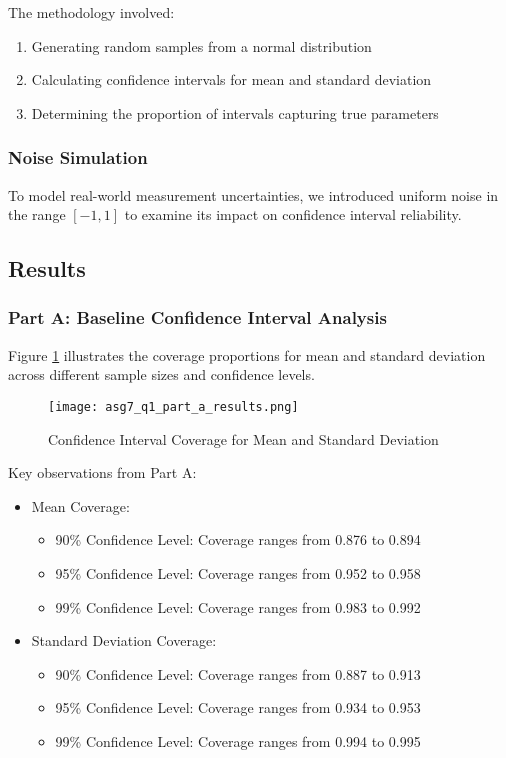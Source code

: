 \documentclass[12pt]{article}
\begin{document}
The methodology involved:
\begin{enumerate}
    \item Generating random samples from a normal distribution
    \item Calculating confidence intervals for mean and standard deviation
    \item Determining the proportion of intervals capturing true parameters
\end{enumerate}

\subsubsection{Noise Simulation}
To model real-world measurement uncertainties, we introduced uniform noise in the range $[-1, 1]$ to examine its impact on confidence interval reliability.

\subsection{Results}

\subsubsection{Part A: Baseline Confidence Interval Analysis}
Figure \ref{fig:asg7_q1_part_a_results} illustrates the coverage proportions for mean and standard deviation across different sample sizes and confidence levels.

\begin{figure}[H]
    \centering
    \texttt{[image: asg7\_q1\_part\_a\_results.png]}
    \caption{Confidence Interval Coverage for Mean and Standard Deviation}
    \label{fig:asg7_q1_part_a_results}
\end{figure}

Key observations from Part A:
\begin{itemize}
    \item Mean Coverage:
    \begin{itemize}
        \item 90\% Confidence Level: Coverage ranges from 0.876 to 0.894
        \item 95\% Confidence Level: Coverage ranges from 0.952 to 0.958
        \item 99\% Confidence Level: Coverage ranges from 0.983 to 0.992
    \end{itemize}
    
    \item Standard Deviation Coverage:
    \begin{itemize}
        \item 90\% Confidence Level: Coverage ranges from 0.887 to 0.913
        \item 95\% Confidence Level: Coverage ranges from 0.934 to 0.953
        \item 99\% Confidence Level: Coverage ranges from 0.994 to 0.995
    \end{itemize}
\end{itemize}
\end{document}
